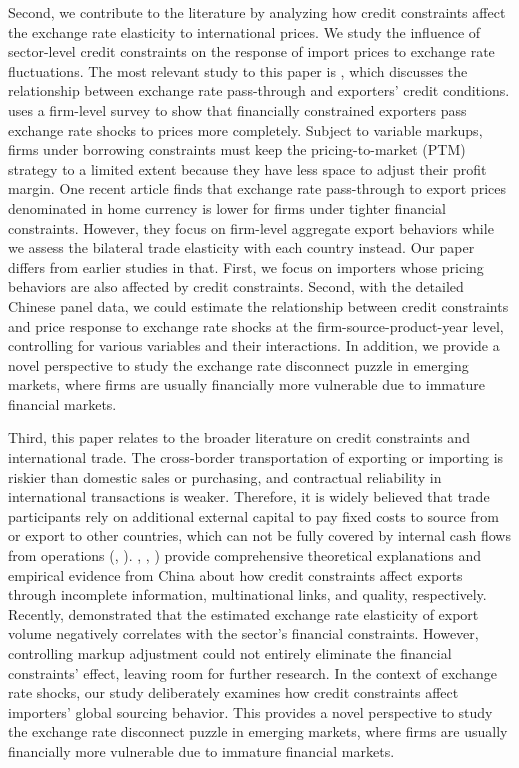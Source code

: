\documentclass[12pt]{article}
\begin{document}
Second, we contribute to the literature by analyzing how credit constraints affect the exchange rate elasticity to international prices. We study the influence of sector-level credit constraints on the response of import prices to exchange rate fluctuations. The most relevant study to this paper is \cite{strasser2013}, which discusses the relationship between exchange rate pass-through and exporters' credit conditions. \cite{strasser2013} uses a firm-level survey to show that financially constrained exporters pass exchange rate shocks to prices more completely. Subject to variable markups, firms under borrowing constraints must keep the pricing-to-market (PTM) strategy to a limited extent because they have less space to adjust their profit margin. One recent article \cite{dai2021} finds that exchange rate pass-through to export prices denominated in home currency is lower for firms under tighter financial constraints. However, they focus on firm-level aggregate export behaviors while we assess the bilateral trade elasticity with each country instead. Our paper differs from earlier studies in that. First, we focus on importers whose pricing behaviors are also affected by credit constraints. Second, with the detailed Chinese panel data, we could estimate the relationship between credit constraints and price response to exchange rate shocks at the firm-source-product-year level, controlling for various variables and their interactions. In addition, we provide a novel perspective to study the exchange rate disconnect puzzle in emerging markets, where firms are usually financially more vulnerable due to immature financial markets.

Third, this paper relates to the broader literature on credit constraints and international trade. The cross-border transportation of exporting or importing is riskier than domestic sales or purchasing, and contractual reliability in international transactions is weaker. Therefore, it is widely believed that trade participants rely on additional external capital to pay fixed costs to source from or export to other countries, which can not be fully covered by internal cash flows from operations (\cite{manova2013}, \cite{chaney2016}). \cite{feenstra-li-yu2014}, \cite{manova-wei-zhang2015}, \cite{fan-lai-li2015}) provide comprehensive theoretical explanations and empirical evidence from China about how credit constraints affect exports through incomplete information, multinational links, and quality, respectively. Recently, \cite{xu-guo2021} demonstrated that the estimated exchange rate elasticity of export volume negatively correlates with the sector’s financial constraints. However, controlling markup adjustment could not entirely eliminate the financial constraints' effect, leaving room for further research. In the context of exchange rate shocks, our study deliberately examines how credit constraints affect importers' global sourcing behavior. This provides a novel perspective to study the exchange rate disconnect puzzle in emerging markets, where firms are usually financially more vulnerable due to immature financial markets.
\end{document}

